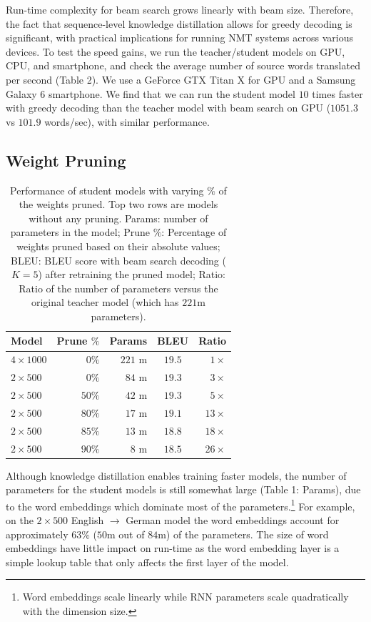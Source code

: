 \documentclass[11pt,letterpaper]{article}
\begin{document}
Run-time complexity for beam search grows linearly with beam size. Therefore,
the fact that sequence-level knowledge distillation allows for greedy decoding  is 
 significant, with practical implications for running NMT systems across various devices. 
 To test the  speed gains,
we run the teacher/student models on GPU, CPU, and smartphone, and check the average
number of source words translated per second (Table 2). We use a GeForce GTX Titan X for 
GPU and a Samsung Galaxy 6 smartphone. We find that we can run the
student model $10$ times faster with greedy decoding than the teacher model with beam search 
on GPU ($1051.3$ vs $101.9$ words/sec), with similar performance.


\subsection{Weight Pruning}

\begin{table}[t] \label{prune}
\centering
\small
\begin{tabular}{l  r  r c  r }
\toprule
Model & Prune $\%$ & Params & BLEU & Ratio \\
\midrule 
$4 \times 1000$ & $0\%$ &$221$ m& $19.5$& $1 \times$   \\
$2 \times 500$ &  $0\%$& $84$ m& $19.3$& $3 \times$   \\
\midrule
$2 \times 500$ & $50\%$& $42$ m&  $19.3$ & $5 \times$ \\
$2 \times 500$ &  $80\%$& $17$ m&  $19.1$ & $13 \times$ \\
$2 \times 500$ &  $85\%$& $13$ m&  $18.8$ & $18 \times$ \\
$2 \times 500$ &  $90\%$& $8$ m &  $18.5$  & $26 \times$ \\

\bottomrule
\end{tabular}
\caption{Performance of student models with varying $\%$ of the weights pruned. Top two
rows are models without any pruning.
Params: number of parameters in the model; Prune $\%$: Percentage of weights pruned based on their absolute values;
BLEU: BLEU score with beam search decoding ($K = 5$) after retraining the pruned model; 
Ratio: Ratio of the number of parameters versus the original teacher model 
(which has $221$m parameters).
}
\end{table}

Although knowledge distillation enables training faster models,
the number of parameters for the student models is still somewhat
large (Table 1: Params), due to the word embeddings which dominate most of the parameters.\footnote{Word
embeddings scale linearly while RNN parameters scale quadratically with the dimension size.}
For example, on the $2 \times 500$ English $\rightarrow$ German model
the word embeddings account for approximately $63\%$ ($50$m out of $84$m) of the parameters.
The size of word embeddings have little impact on run-time as the word embedding layer is
 a simple lookup table that only affects the first layer of the model.
\end{document}
